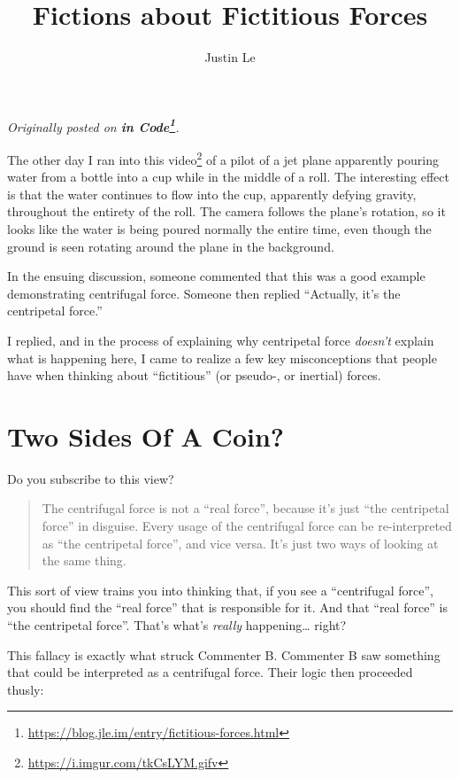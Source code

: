 \documentclass[]{article}
\title{Fictions about Fictitious Forces}
\author{Justin Le}
\renewcommand{\href}[2]{#2\footnote{\url{#1}}}
\begin{document}
\maketitle

\emph{Originally posted on
\textbf{\href{https://blog.jle.im/entry/fictitious-forces.html}{in Code}}.}

The other day I ran into \href{https://i.imgur.com/tkCsLYM.gifv}{this video} of
a pilot of a jet plane apparently pouring water from a bottle into a cup while
in the middle of a roll. The interesting effect is that the water continues to
flow into the cup, apparently defying gravity, throughout the entirety of the
roll. The camera follows the plane's rotation, so it looks like the water is
being poured normally the entire time, even though the ground is seen rotating
around the plane in the background.

In the ensuing discussion, someone commented that this was a good example
demonstrating centrifugal force. Someone then replied ``Actually, it's the
centripetal force.''

I replied, and in the process of explaining why centripetal force \emph{doesn't}
explain what is happening here, I came to realize a few key misconceptions that
people have when thinking about ``fictitious'' (or pseudo-, or inertial) forces.

\hypertarget{two-sides-of-a-coin}{%
\section{Two Sides Of A Coin?}\label{two-sides-of-a-coin}}

Do you subscribe to this view?

\begin{quote}
The centrifugal force is not a ``real force'', because it's just ``the
centripetal force'' in disguise. Every usage of the centrifugal force can be
re-interpreted as ``the centripetal force'', and vice versa. It's just two ways
of looking at the same thing.
\end{quote}

This sort of view trains you into thinking that, if you see a ``centrifugal
force'', you should find the ``real force'' that is responsible for it. And that
``real force'' is ``the centripetal force''. That's what's \emph{really}
happening\ldots{} right?

This fallacy is exactly what struck Commenter B. Commenter B saw something that
could be interpreted as a centrifugal force. Their logic then proceeded thusly:
\end{document}
